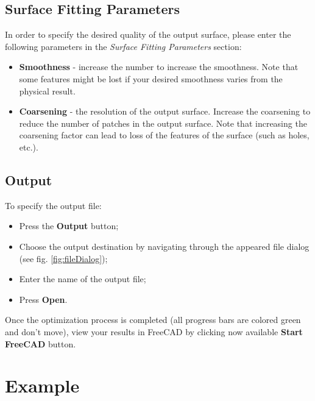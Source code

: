 \documentclass[
12pt, %
a4paper, %
oneside, %
headinclude,footinclude, %
BCOR5mm, %
]{scrartcl}
\begin{document}
\subsection{Surface Fitting Parameters}
In order to specify the desired quality of the output surface, please enter the following parameters in the \textit{Surface Fitting Parameters} section:
\begin{itemize}
\item \textbf{Smoothness} - increase the number to increase the smoothness. Note that some features might be lost if your desired smoothness varies from the physical result.
\item \textbf{Coarsening} - the resolution of the output surface.  Increase the coarsening to reduce the number of patches in the output surface. Note that increasing the coarsening factor can lead to loss of the features of the surface (such as holes, etc.).
\end{itemize}
\subsection{Output}
To specify the output file:
\begin{itemize}
\item Press the \textbf{Output} button;
\item Choose the output destination by navigating through the appeared file dialog (see fig. \ref{fig:fileDialog});
\item Enter the name of the output file;
\item Press \textbf{Open}.
\end{itemize}

Once the optimization process is completed (all progress bars are colored green and don't move), view your results in FreeCAD by clicking now available \textbf{Start FreeCAD} button.

\section{Example}
\end{document}
